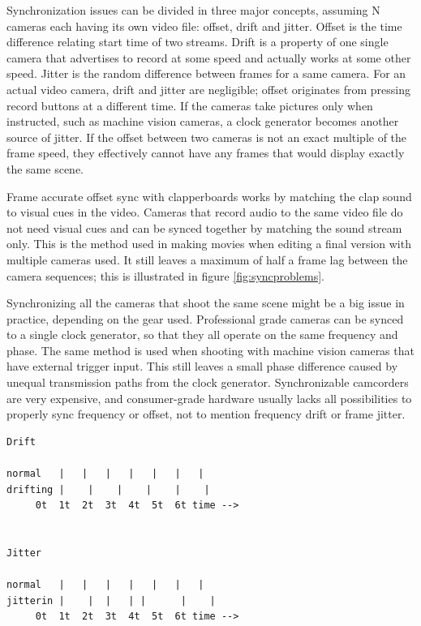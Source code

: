 Synchronization issues can be divided in three major concepts, assuming N cameras each having its own video file: offset, drift and jitter.
Offset is the time difference relating start time of two streams.
Drift is a property of one single camera that advertises to record at some speed and actually works at some other speed.
Jitter is the random difference between frames for a same camera.
For an actual video camera, drift and jitter are negligible; offset originates from pressing record buttons at a different time.
If the cameras take pictures only when instructed, such as machine vision cameras, a clock generator becomes another source of jitter.
If the offset between two cameras is not an exact multiple of the frame speed, they effectively cannot have any frames that would display exactly the same scene.

Frame accurate offset sync with clapperboards works by matching the clap sound to visual cues in the video.
Cameras that record audio to the same video file do not need visual cues and can be synced together by matching the sound stream only.
This is the method used in making movies when editing a final version with multiple cameras used.
It still leaves a maximum of half a frame lag between the camera sequences; this is illustrated in figure \ref{fig:syncproblems}.

Synchronizing all the cameras that shoot the same scene might be a big issue in practice, depending on the gear used.
Professional grade cameras can be synced to a single clock generator, so that they all operate on the same frequency and phase.
The same method is used when shooting with machine vision cameras that have external trigger input.
This still leaves a small phase difference caused by unequal transmission paths from the clock generator.
Synchronizable camcorders are very expensive, and consumer-grade hardware usually lacks all possibilities to properly sync frequency or offset, not to mention frequency drift or frame jitter.

\begin{verbatim}
Drift

normal   |   |   |   |   |   |   |
drifting |    |    |    |    |    |
	 0t  1t  2t  3t  4t  5t  6t time -->


Jitter

normal   |   |   |   |   |   |   |
jitterin |    |  |   | |      |    |
	 0t  1t  2t  3t  4t  5t  6t time -->
\end{verbatim}


